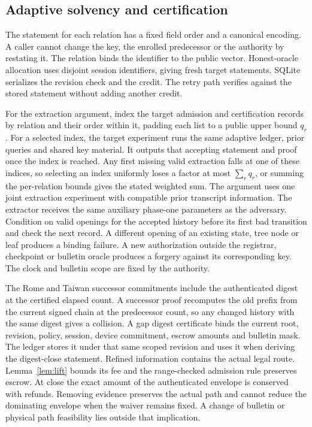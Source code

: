 \subsection{Adaptive solvency and certification}
The statement for each relation has a fixed field order and a canonical encoding. A caller cannot change the key, the enrolled predecessor or the authority by restating it. The relation binds the identifier to the public vector. Honest-oracle allocation uses disjoint session identifiers, giving fresh target statements. SQLite serializes the revision check and the credit. The retry path verifies against the stored statement without adding another credit.

For the extraction argument, index the target admission and certification records by relation and their order within it, padding each list to a public upper bound $q_r$. For a selected index, the target experiment runs the same adaptive ledger, prior queries and shared key material. It outputs that accepting statement and proof once the index is reached. Any first missing valid extraction falls at one of these indices, so selecting an index uniformly loses a factor at most $\sum_r q_r$, or summing the per-relation bounds gives the stated weighted sum. The argument uses one joint extraction experiment with compatible prior transcript information. The extractor receives the same auxiliary phase-one parameters as the adversary. Condition on valid openings for the accepted history before its first bad transition and check the next record. A different opening of an existing state, tree node or leaf produces a binding failure. A new authorization outside the registrar, checkpoint or bulletin oracle produces a forgery against its corresponding key. The clock and bulletin scope are fixed by the authority.

The Rome and Taiwan successor commitments include the authenticated digest at the certified elapsed count. A successor proof recomputes the old prefix from the current signed chain at the predecessor count, so any changed history with the same digest gives a collision. A gap digest certificate binds the current root, revision, policy, session, device commitment, escrow amounts and bulletin mask. The ledger stores it under that same scoped revision and uses it when deriving the digest-close statement. Refined information contains the actual legal route. Lemma~\ref{lem:lift} bounds its fee and the range-checked admission rule preserves escrow. At close the exact amount of the authenticated envelope is conserved with refunds. Removing evidence preserves the actual path and cannot reduce the dominating envelope when the waiver remains fixed. A change of bulletin or physical path feasibility lies outside that implication.

